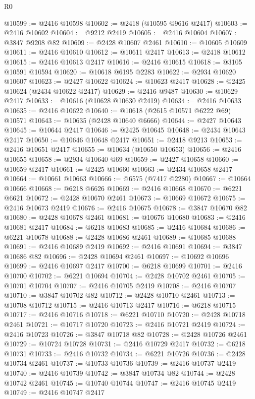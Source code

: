 \begin{lexlean}{R0}
\begin{coremodule}
@10599 := @2416 @10598
@10602 := @2418 (@10595 @9616 @2417)
@10603 := @2416 @10602
@10604 := @9212 @2419
@10605 := @2416 @10604
@10607 := @3847 @9208 @82
@10609 := @2428 @10607 @2461
@10610 := @10605 @10609
@10611 := @2416 @10610
@10612 := @10611 @2417
@10613 := @2418 @10612
@10615 := @2416 @10613 @2417
@10616 := @2416 @10615
@10618 := @3105 @10591 @10594
@10620 := @10618 @6195 @2283
@10622 := @2934 @10620 @10607
@10623 := @2427 @10622
@10624 := @10623 @2417
@10628 := @2425 @10624 (@2434 @10622 @2417)
@10629 := @2416 @9487
@10630 := @10629 @2417
@10633 := @10616 (@10628 @10630 @2419)
@10634 := @2416 @10633
@10635 := @2416 @10622
@10640 := @10618 (@2615 @10571 @6222 @69) @10571
@10643 := @10635 (@2428 @10640 @6666)
@10644 := @2427 @10643
@10645 := @10644 @2417
@10646 := @2425 @10645
@10648 := @2434 @10643 @2417
@10650 := @10646 @10648 @2417
@10651 := @2418 @9213
@10653 := @2416 @10651 @2417
@10655 := @10634 (@10650 @10653)
@10656 := @2416 @10655
@10658 := @2934 @10640 @69
@10659 := @2427 @10658
@10660 := @10659 @2417
@10661 := @2425 @10660
@10663 := @2434 @10658 @2417
@10664 := @10661 @10663
@10666 := @6575 (@7417 @2280)
@10667 := @10664 @10666
@10668 := @6218 @6626
@10669 := @2416 @10668
@10670 := @6221 @6621
@10672 := @2428 @10670 @2461
@10673 := @10669 @10672
@10675 := @2416 @10673 @2419
@10676 := @2416 @10675
@10678 := @3847 @10670 @82
@10680 := @2428 @10678 @2461
@10681 := @10676 @10680
@10683 := @2416 @10681 @2417
@10684 := @6218 @10683
@10685 := @2416 @10684
@10686 := @6221 @10678
@10688 := @2428 @10686 @2461
@10689 := @10685 @10688
@10691 := @2416 @10689 @2419
@10692 := @2416 @10691
@10694 := @3847 @10686 @82
@10696 := @2428 @10694 @2461
@10697 := @10692 @10696
@10699 := @2416 @10697 @2417
@10700 := @6218 @10699
@10701 := @2416 @10700
@10702 := @6221 @10694
@10704 := @2428 @10702 @2461
@10705 := @10701 @10704
@10707 := @2416 @10705 @2419
@10708 := @2416 @10707
@10710 := @3847 @10702 @82
@10712 := @2428 @10710 @2461
@10713 := @10708 @10712
@10715 := @2416 @10713 @2417
@10716 := @6218 @10715
@10717 := @2416 @10716
@10718 := @6221 @10710
@10720 := @2428 @10718 @2461
@10721 := @10717 @10720
@10723 := @2416 @10721 @2419
@10724 := @2416 @10723
@10726 := @3847 @10718 @82
@10728 := @2428 @10726 @2461
@10729 := @10724 @10728
@10731 := @2416 @10729 @2417
@10732 := @6218 @10731
@10733 := @2416 @10732
@10734 := @6221 @10726
@10736 := @2428 @10734 @2461
@10737 := @10733 @10736
@10739 := @2416 @10737 @2419
@10740 := @2416 @10739
@10742 := @3847 @10734 @82
@10744 := @2428 @10742 @2461
@10745 := @10740 @10744
@10747 := @2416 @10745 @2419
@10749 := @2416 @10747 @2417

\end{coremodule}
\end{lexlean}

